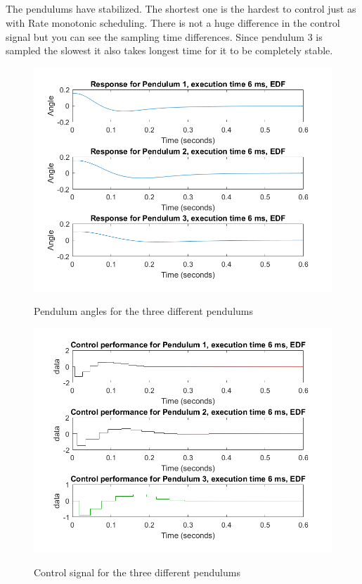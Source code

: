\documentclass[12pt,a4paper]{article}
\begin{document}
\subsection{} %
The pendulums have stabilized. The shortest one is the hardest to control just as with Rate monotonic scheduling. There is not a huge difference in the control signal but you can see the sampling time differences. Since pendulum 3 is sampled the slowest it also takes longest time for it to be completely stable.
\begin{center}
	\begin{figure}[H]
      \centering
	\includegraphics[scale=0.5]{ex61.png}
	\label{fig:ex61}
	\caption{Pendulum angles for the three different pendulums}
	\end{figure}
\end{center}
\begin{center}
	\begin{figure}[H]
      \centering
	\includegraphics[scale=0.5]{ex62.png}
	\label{fig:ex62}
	\caption{Control signal  for the three different pendulums}
	\end{figure}
\end{center}
\end{document}
